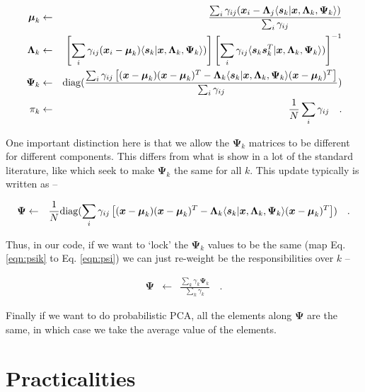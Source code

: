 \documentclass[letterpaper,12pt]{article}
\newcommand{\vect}[1]{\boldsymbol{#1}}
\newcommand{\data}{\vect{x}}
\newcommand{\latent}{\vect{s}}
\newcommand{\mean}{\vect{\mu}}
\newcommand{\lmda}{\vect{\Lambda}}
\newcommand{\ps}{\vect{\Psi}}
\begin{document}
\begin{eqnarray}\displaystyle
\mean_k &\leftarrow& \frac{\sum_i\gamma_{ij}(\data_i-{\lmda_j \langle\latent_k|\data,\lmda_k,\ps_k\rangle})}{\sum_i\gamma_{ij}} \\
\lmda_k &\leftarrow& \left[ \sum_i\gamma_{ij}(\data_i- \mean_k)\langle\latent_k|\data,\lmda_k,\ps_k\rangle) \right]  \left[ \sum_i\gamma_{ij}\langle\latent_k\latent_k^T|\data,\lmda_k,\ps_k\rangle) \right]^{-1}\\
\label{eqn:psik}
\ps_k &\leftarrow& {\rm diag}(\frac{\sum_i\gamma_{ij}\left[(\data-\mean_k)(\data-\mean_k)^T-\lmda_k \langle\latent_k|\data,\lmda_k,\ps_k\rangle(\data-\mean_k)^T\right]}{\sum_i\gamma_{ij}}) \\
\pi_k &\leftarrow& \frac{1}{N}\sum_i\gamma_{ij}
\quad .
\end{eqnarray}

One important distinction here is that we allow the $\ps_k$ matrices to be different for 
different components.  This differs from what is show in a lot of the standard literature, 
like \citet{ghahramani96} which seek to make $\ps_k$ the same for all $k$.  This update 
typically is written as --

\begin{eqnarray}\displaystyle
\label{eqn:psi}
\ps &\leftarrow& \frac{1}{N}{\rm diag}(\sum_i\gamma_{ij}\left[(\data-\mean_k)(\data-\mean_k)^T-\lmda_k \langle\latent_k|\data,\lmda_k,\ps_k\rangle(\data-\mean_k)^T\right]) 
\quad .
\end{eqnarray}

Thus, in our code, if we want to `lock' the $\ps_k$ values to be the same (map Eq. 
\ref{eqn:psik} to Eq. \ref{eqn:psi}) we can just re-weight be the responsibilities 
over $k$ --

\begin{eqnarray}\displaystyle
\ps &\leftarrow& \frac{\sum_k \gamma_k \ps_k}{\sum_k \gamma_k } 
\quad .
\end{eqnarray}

Finally if we want to do probabilistic PCA, all the elements along $\ps$ are the same, 
in which case we take the average value of the elements.

\section{Practicalities}
\end{document}
